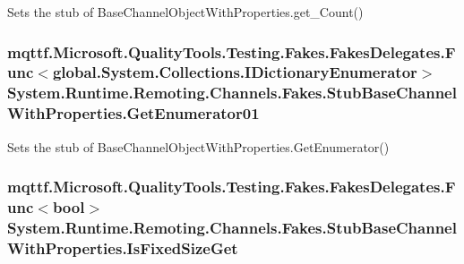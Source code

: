 Sets the stub of Base\-Channel\-Object\-With\-Properties.\-get\-\_\-\-Count()

\hypertarget{class_system_1_1_runtime_1_1_remoting_1_1_channels_1_1_fakes_1_1_stub_base_channel_with_properties_ab96971662781c9a4b04054975a27bb38}{
\subsubsection[{Get\-Enumerator01}]{\setlength{\rightskip}{0pt plus 5cm}mqttf.\-Microsoft.\-Quality\-Tools.\-Testing.\-Fakes.\-Fakes\-Delegates.\-Func$<$global.\-System.\-Collections.\-I\-Dictionary\-Enumerator$>$ System.\-Runtime.\-Remoting.\-Channels.\-Fakes.\-Stub\-Base\-Channel\-With\-Properties.\-Get\-Enumerator01}}\label{class_system_1_1_runtime_1_1_remoting_1_1_channels_1_1_fakes_1_1_stub_base_channel_with_properties_ab96971662781c9a4b04054975a27bb38}


Sets the stub of Base\-Channel\-Object\-With\-Properties.\-Get\-Enumerator()

\hypertarget{class_system_1_1_runtime_1_1_remoting_1_1_channels_1_1_fakes_1_1_stub_base_channel_with_properties_a9f7d855c8ca1f70907e4ce09f305b1b1}{
\subsubsection[{Is\-Fixed\-Size\-Get}]{\setlength{\rightskip}{0pt plus 5cm}mqttf.\-Microsoft.\-Quality\-Tools.\-Testing.\-Fakes.\-Fakes\-Delegates.\-Func$<$bool$>$ System.\-Runtime.\-Remoting.\-Channels.\-Fakes.\-Stub\-Base\-Channel\-With\-Properties.\-Is\-Fixed\-Size\-Get}}\label{class_system_1_1_runtime_1_1_remoting_1_1_channels_1_1_fakes_1_1_stub_base_channel_with_properties_a9f7d855c8ca1f70907e4ce09f305b1b1}


